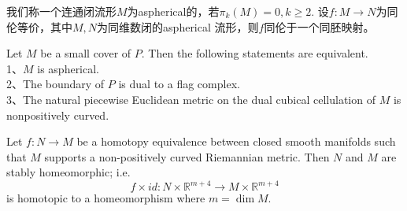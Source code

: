 \documentclass{article}
\theoremstyle{plain}%
\theoremstyle{definition}
\theoremstyle{remark}
\begin{document}
{ %
 
 
 
 
 
 
 
 
 
 
 







 
 { 
 我们称一个连通闭流形$M$为aspherical的，若$\pi_k(M)=0, k\geq 2$.}
 {\conj   设$f:M\longrightarrow N$为同伦等价，其中$M,N$为同维数闭的aspherical 流形，则$f$同伦于一个同胚映射。}

{ Let $M$ be a small cover of $P$. Then the following statements are equivalent.\\
%
1、$M$ is aspherical.\\
2、The boundary of $P$ is dual to a flag complex. \\
3、The natural piecewise Euclidean metric on the dual cubical cellulation of $M$ is nonpositively curved.}

{\thm [\cite{F1}] Let $f:N\longrightarrow M$ be a homotopy equivalence between closed smooth manifolds such that $M$ supports a non-positively curved Riemannian metric. Then $N$ and $M$ are stably homeomorphic; i.e.
\begin{equation}\label{eq8}
f\times id :N\times \mathbb{R}^{m+4}\longrightarrow M\times \mathbb{R}^{m+4}
\end{equation}
is homotopic to a homeomorphism where $m=\dim{M}$.}

}
\end{document}
